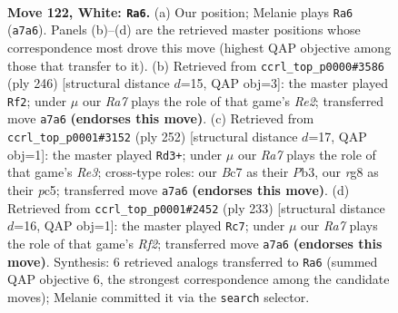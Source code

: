 \documentclass[11pt]{article}
\begin{document}
\clearpage

\begin{figure}[p]\centering
\begin{subfigure}{0.46\textwidth}\centering
\resizebox{\linewidth}{!}{%
\newchessgame
\chessboard[
  setfen={6r1/R1B4k/8/P7/4K3/8/8/8 w - - 13 122},
  showmover=false,
  pgfstyle=straightmove, color=movearrow, markmove={a7-a6}
]}
\caption{}
\end{subfigure}\hfill
\begin{subfigure}{0.46\textwidth}\centering
\resizebox{\linewidth}{!}{%
\newchessgame
\chessboard[
  setfen={2r5/1k6/7P/3K4/8/4B3/2b1R3/8 w - - 13 124},
  showmover=false,
  pgfstyle=straightmove, color=movearrow, markmove={e2-f2}
]}
\caption{}
\end{subfigure}
\\[4pt]
\begin{subfigure}{0.46\textwidth}\centering
\resizebox{\linewidth}{!}{%
\newchessgame
\chessboard[
  setfen={5r2/8/8/2pk4/8/KP2R3/8/8 w - - 2 127},
  showmover=false,
  pgfstyle=straightmove, color=movearrow, markmove={e3-d3}
]}
\caption{}
\end{subfigure}\hfill
\begin{subfigure}{0.46\textwidth}\centering
\resizebox{\linewidth}{!}{%
\newchessgame
\chessboard[
  setfen={8/p4r2/2B1R3/2b5/5k2/8/3K4/8 b - - 29 117},
  showmover=false,
  pgfstyle=straightmove, color=movearrow, markmove={f7-c7}
]}
\caption{}
\end{subfigure}
\caption{\textbf{Move 122, White: \texttt{Ra6}.} (a) Our position; Melanie plays \texttt{Ra6} (\texttt{a7a6}). Panels (b)--(d) are the retrieved master positions whose correspondence most drove this move (highest QAP objective among those that transfer to it). (b) Retrieved from \texttt{ccrl\_top\_p0000\#3586} (ply 246) [structural distance $d$=15, QAP obj=3]: the master played \texttt{Rf2}; under $\mu$ our \emph{Ra7} plays the role of that game's \emph{Re2}; transferred move \texttt{a7a6} \textbf{(endorses this move)}. (c) Retrieved from \texttt{ccrl\_top\_p0001\#3152} (ply 252) [structural distance $d$=17, QAP obj=1]: the master played \texttt{Rd3+}; under $\mu$ our \emph{Ra7} plays the role of that game's \emph{Re3}; cross-type roles: our \emph{B}c7 as their \emph{P}b3, our \emph{r}g8 as their \emph{p}c5; transferred move \texttt{a7a6} \textbf{(endorses this move)}. (d) Retrieved from \texttt{ccrl\_top\_p0001\#2452} (ply 233) [structural distance $d$=16, QAP obj=1]: the master played \texttt{Rc7}; under $\mu$ our \emph{Ra7} plays the role of that game's \emph{Rf2}; transferred move \texttt{a7a6} \textbf{(endorses this move)}. Synthesis: 6 retrieved analogs transferred to \texttt{Ra6} (summed QAP objective 6, the strongest correspondence among the candidate moves); Melanie committed it via the \texttt{search} selector.}
\label{fig:thought-m242}
\end{figure}
\end{document}
